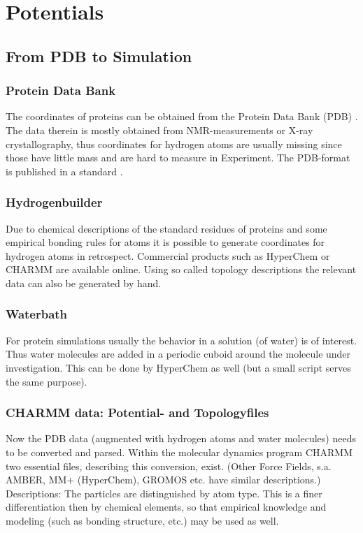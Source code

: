 \chapter{Potentials}





\section{From PDB to Simulation}


\subsection{Protein Data Bank}
The coordinates of proteins can be obtained from the Protein Data Bank (PDB)
\cite{pdb-online}. The data therein is mostly obtained from NMR-measurements
or X-ray crystallography, thus coordinates for hydrogen atoms are usually missing
since those have little mass and are hard to measure in Experiment. The
PDB-format is published in a standard \cite{pdb-standard-online}.
\subsection{Hydrogenbuilder}
Due to chemical descriptions of the standard residues of proteins and some empirical
bonding rules for atoms it is possible to generate coordinates for hydrogen atoms in
retrospect. Commercial products such as HyperChem \cite{hyperchem-online} or CHARMM
are available online. Using so called topology descriptions the relevant data can
also be generated by hand.
\subsection{Waterbath}
For protein simulations usually the behavior in a solution (of water) is of interest.
Thus water molecules are added in a periodic cuboid around the molecule under investigation.
This can be done by HyperChem as well (but a small script serves the same purpose).

\subsection{CHARMM data: Potential- and Topologyfiles}
Now the PDB data (augmented with hydrogen atoms and water molecules) needs to be
converted and parsed. Within the molecular dynamics program
CHARMM two essential files, describing this conversion, exist. (Other Force Fields,
s.a. AMBER, MM+ (HyperChem), GROMOS etc. have similar descriptions.)
Descriptions: The particles are distinguished by atom type. This is a finer
differentiation then by chemical elements, so that empirical knowledge and modeling
(such as bonding structure, etc.) may be used as well.

